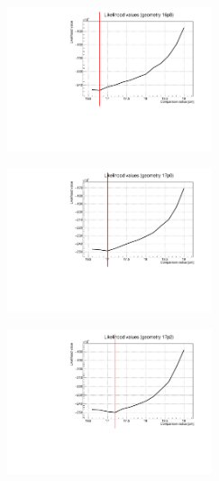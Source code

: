 \documentclass[a4paper, 11pt]{report}
\begin{document}
\begin{figure}[htbp]
\centering
\begin{minipage}[b]{.32\textwidth}
\includegraphics[width=6cm, height=4.6cm]{figs/likelihood250LowStat/likelihood16p8.pdf}
\end{minipage}\hfill
\begin{minipage}[b]{.32\textwidth}
\includegraphics[width=6cm, height=4.6cm]{figs/likelihood250LowStat/likelihood17p0.pdf}
\end{minipage} \hfill
\begin{minipage}[b]{.32\textwidth}
\includegraphics[width=6cm, height=4.6cm]{figs/likelihood250LowStat/likelihood17p2.pdf}
\end{minipage} \hfill \vspace{10pt}


\end{figure}
\end{document}
